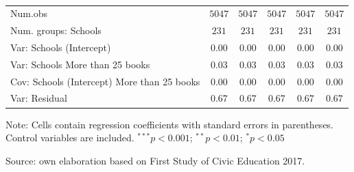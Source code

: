 \documentclass[
  12pt,
  letterpaper,
]{article}
\begin{document}
\begin{table}
{\begin{center}
{\begin{threeparttable}
\begin{tabular}{l c c c c c}
Num.obs                                     & $5047$        & $5047$        & $5047$        & $5047$        & $5047$        \\
Num. groups: Schools                        & $231$         & $231$         & $231$         & $231$         & $231$         \\
Var: Schools (Intercept)                    & $0.00$        & $0.00$        & $0.00$        & $0.00$        & $0.00$        \\
Var: Schools More than 25 books             & $0.03$        & $0.03$        & $0.03$        & $0.03$        & $0.03$        \\
Cov: Schools (Intercept) More than 25 books & $0.00$        & $0.00$        & $0.00$        & $0.00$        & $0.00$        \\
Var: Residual                               & $0.67$        & $0.67$        & $0.67$        & $0.67$        & $0.67$        \\
\bottomrule
\end{tabular}
\begin{tablenotes}[flushleft]
\scriptsize{\item Note: Cells contain regression coefficients with standard errors in parentheses. Control variables are included. $^{***}p<0.001$; $^{**}p<0.01$; $^{*}p<0.05$ \\ \item Source: own elaboration based on First Study of Civic Education 2017.}
\end{tablenotes}
\end{threeparttable}
}
\caption{}
\label{table:coefficients}
\end{center}

}

\end{table}%
\end{document}
